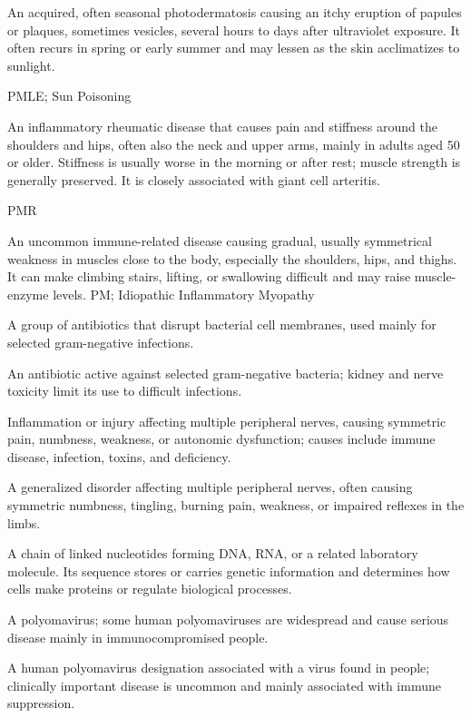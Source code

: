  An acquired, often seasonal photodermatosis causing an itchy eruption of papules or plaques, sometimes vesicles, several hours to days after ultraviolet exposure. It often recurs in spring or early summer and may lessen as the skin acclimatizes to sunlight.

\synonyms
PMLE; Sun Poisoning

 An inflammatory rheumatic disease that causes pain and stiffness around the shoulders and hips, often also the neck and upper arms, mainly in adults aged 50 or older. Stiffness is usually worse in the morning or after rest; muscle strength is generally preserved. It is closely associated with giant cell arteritis.

\synonyms
PMR

 An uncommon immune-related disease causing gradual, usually symmetrical weakness in muscles close to the body, especially the shoulders, hips, and thighs. It can make climbing stairs, lifting, or swallowing difficult and may raise muscle-enzyme levels.
\synonyms
PM; Idiopathic Inflammatory Myopathy

 A group of antibiotics that disrupt bacterial cell membranes, used mainly for selected gram-negative infections.

 An antibiotic active against selected gram-negative bacteria; kidney and nerve toxicity limit its use to difficult infections.

 Inflammation or injury affecting multiple peripheral nerves, causing symmetric pain, numbness, weakness, or autonomic dysfunction; causes include immune disease, infection, toxins, and deficiency.

 A generalized disorder affecting multiple peripheral nerves, often causing symmetric numbness, tingling, burning pain, weakness, or impaired reflexes in the limbs.

 A chain of linked nucleotides forming DNA, RNA, or a related laboratory molecule. Its sequence stores or carries genetic information and determines how cells make proteins or regulate biological processes.

 A polyomavirus; some human polyomaviruses are widespread and cause serious disease mainly in immunocompromised people.

 A human polyomavirus designation associated with a virus found in people; clinically important disease is uncommon and mainly associated with immune suppression.

